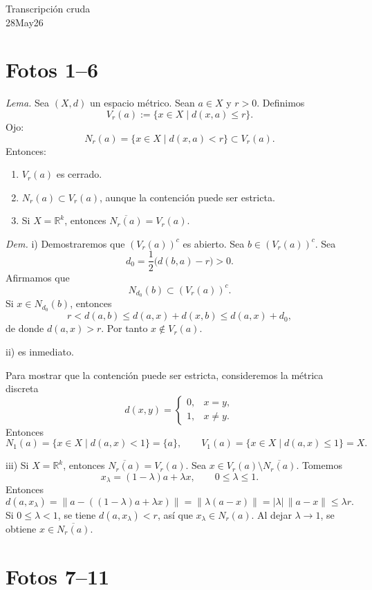\documentclass[12pt]{article}
\begin{document}
\begin{center}
{\Large Transcripción cruda}\\[2mm]
{\large 28May26}
\end{center}

\section*{Fotos 1--6}

\textit{Lema.} Sea $(X,d)$ un espacio métrico.
Sean $a\in X$ y $r>0$.
Definimos
\[
V_r(a):=\{x\in X\mid d(x,a)\le r\}.
\]
Ojo:
\[
N_r(a)=\{x\in X\mid d(x,a)<r\}\subset V_r(a).
\]
Entonces:
\begin{enumerate}[label=\roman*)]
    \item $V_r(a)$ es cerrado.
    \item $N_r(a)\subset V_r(a)$, aunque la contención puede ser estricta.
    \item Si $X=\mathbb R^k$, entonces $\overline{N_r(a)}=V_r(a)$.
\end{enumerate}

\textit{Dem.} i) Demostraremos que $(V_r(a))^c$ es abierto.
Sea $b\in (V_r(a))^c$.
Sea
\[
d_0=\frac12\bigl(d(b,a)-r\bigr)>0.
\]
Afirmamos que
\[
N_{d_0}(b)\subset (V_r(a))^c.
\]
Si $x\in N_{d_0}(b)$, entonces
\[
r<d(a,b)\le d(a,x)+d(x,b)\le d(a,x)+d_0,
\]
de donde $d(a,x)>r$.
Por tanto $x\notin V_r(a)$.

ii) es inmediato.

Para mostrar que la contención puede ser estricta, consideremos la métrica discreta
\[
d(x,y)=\begin{cases}
0,&x=y,\\
1,&x\ne y.
\end{cases}
\]
Entonces
\[
N_1(a)=\{x\in X\mid d(a,x)<1\}=\{a\},
\qquad
V_1(a)=\{x\in X\mid d(a,x)\le 1\}=X.
\]

iii) Si $X=\mathbb R^k$, entonces $\overline{N_r(a)}=V_r(a)$.
Sea $x\in V_r(a)\setminus \overline{N_r(a)}$.
Tomemos
\[
x_\lambda=(1-\lambda)a+\lambda x,\qquad 0\le \lambda\le 1.
\]
Entonces
\[
d(a,x_\lambda)=\|a-((1-\lambda)a+\lambda x)\|
=\|\lambda(a-x)\|
=|\lambda|\,\|a-x\|
\le \lambda r.
\]
Si $0\le\lambda<1$, se tiene $d(a,x_\lambda)<r$, así que $x_\lambda\in N_r(a)$.
Al dejar $\lambda\to 1$, se obtiene $x\in\overline{N_r(a)}$.

\section*{Fotos 7--11}
\end{document}
